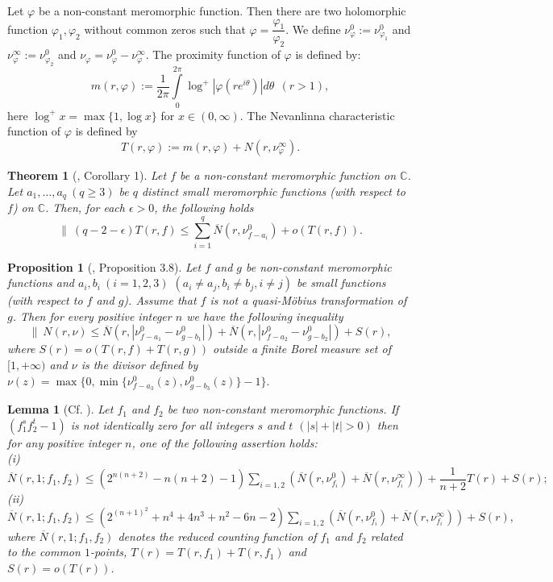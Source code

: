 \documentclass[12pt,leqno]{amsart}
\newtheorem{lemma}[equation]{Lemma}
\newtheorem{proposition}[equation]{Proposition}
\newtheorem{theorem}[equation]{Theorem}
\newcommand{\C}{{\mathbb{C}}}
\numberwithin{equation}{section}
\begin{document}
Let $\varphi$ be a non-constant meromorphic function. Then there are two holomorphic function $\varphi_1,\varphi_2$ without common zeros such that $\varphi =\dfrac{\varphi_1}{\varphi_2}$. We define 
$ \nu_\varphi^0:=\nu_{\varphi_1}^0$ and $\nu_\varphi^\infty:=\nu_{\varphi_2}^0$ and $\nu_\varphi=\nu^0_\varphi -\nu^\infty_\varphi$. The proximity function of $\varphi$ is defined by:
$$ m(r,\varphi ):=\frac{1}{2\pi}\int\limits_{0}^{2\pi}\log^+|\varphi (re^{i\theta})|d\theta\ \ (r>1), $$
here $\log^+x=\max\{1,\log x\}$ for $x\in (0,\infty )$. The Nevanlinna characteristic function of $\varphi$ is defined by
$$ T(r,\varphi ):=m(r,\varphi ) +N(r,\nu^\infty_{\varphi}).$$

\begin{theorem}[\cite{Y}, Corollary 1]\label{2.1}
Let $f$ be a non-constant meromorphic function on $\C$. Let $a_1,\dots ,a_q\ (q\ge 3)$ be $q$ distinct small meromorphic functions (with respect to $f$) on $\C$. Then, for each $\epsilon >0$, the
following holds
$$\|\ (q-2-\epsilon)T(r,f)\le \sum_{i=1}^q\overline N(r,\nu^0_{f-a_i})+o(T(r,f)).$$
\end{theorem}

\begin{proposition}[\cite{QA}, Proposition 3.8]\label{2.2}
Let $f$ and $g$ be non-constant meromorphic functions and $a_i,b_i\ (i=1,2,3)$ $ (a_i\ne a_j, b_i\ne b_j, i\ne j)$ be small functions (with respect to $f$ and $g$). Assume that $f$ is not a quasi-M\"{o}bius transformation of $g$. Then for every positive integer $n$ we have the following inequality
$$\|\  N(r,\nu)\le \overline N(r,|\nu^0_{f-a_1}-\nu^0_{g-b_1}|)+\overline N(r,|\nu^0_{f-a_2}-\nu^0_{g-b_2}|)+S(r), $$
where $S(r)=o(T(r,f)+T(r,g))$ outside a finite Borel measure set of $[1,+\infty)$ and $\nu$ is the divisor defined by 
$\nu (z)=\max\{0,\min\{\nu^0_{f-a_3}(z),\nu^0_{g-b_3}(z)\}-1\}.$
\end{proposition}

\begin{lemma}[{Cf. \cite[Lemma 3.2]{QK}}]\label{2.5}
Let $f_1$ and $f_2$ be two non-constant meromorphic functions. If $(f_1^sf_2^t-1)$ is not identically zero for all integers $s$ and $t$ $(|s|+|t|>0)$ then for any positive integer $n$, one of the following assertion holds:\\
(i) $\overline N(r,1;f_1,f_2)\leq (2^{n(n+2)}-n(n+2)-1)\sum_{i=1,2}\left(\overline N(r,\nu^0_{f_i})+\overline N(r,\nu^\infty_{f_i})\right)+\dfrac{1}{n+2}T(r)+S(r);$\\
(ii) $\overline N(r,1;f_1,f_2)\leq (2^{(n+1)^2}+n^4+4n^3+n^2-6n-2)\sum_{i=1,2}\left(\overline N(r,\nu^0_{f_i})+\overline N(r,\nu^\infty_{f_i})\right)+S(r),$\\
where $\overline N(r,1;f_1,f_2)$ denotes the reduced counting function of $f_1$ and $f_2$ related to the common $1$-points, $T(r)=T(r,f_1)+T(r,f_1)$ and $S(r)=o(T(r))$.
\end{lemma}
\end{document}
